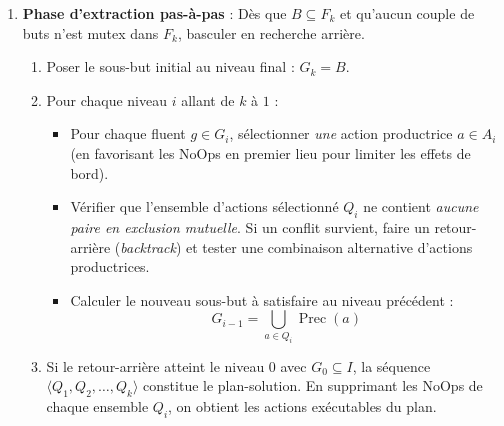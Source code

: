 \begin{proposition}
\begin{enumerate}
        \item \textbf{Phase d'extraction pas-à-pas} :  Dès que $B \subseteq F_k$ et qu'aucun couple de buts n'est mutex dans $F_k$, basculer en recherche arrière.
        \begin{enumerate}
            \item Poser le sous-but initial au niveau final : $G_k = B$.
            \item Pour chaque niveau $i$ allant de $k$ à $1$ :
            \begin{itemize}
                \item Pour chaque fluent $g \in G_i$, sélectionner \emph{une} action productrice $a \in A_i$ (en favorisant les NoOps en premier lieu pour limiter les effets de bord).
                \item Vérifier que l'ensemble d'actions sélectionné $Q_i$ ne contient \emph{aucune paire en exclusion mutuelle}. Si un conflit survient, faire un retour-arrière (\emph{backtrack}) et tester une combinaison alternative d'actions productrices.
                \item Calculer le nouveau sous-but à satisfaire au niveau précédent :
                \begin{equation}
                    G_{i-1} = \bigcup_{a \in Q_i} \operatorname{Prec}(a)
                \end{equation}
            \end{itemize}
            \item Si le retour-arrière atteint le niveau $0$ avec $G_0 \subseteq I$, la séquence $\langle Q_1, Q_2, \dots, Q_k \rangle$ constitue le plan-solution. En supprimant les NoOps de chaque ensemble $Q_i$, on obtient les actions exécutables du plan.
        \end{enumerate}
    \end{enumerate}
\end{proposition}

